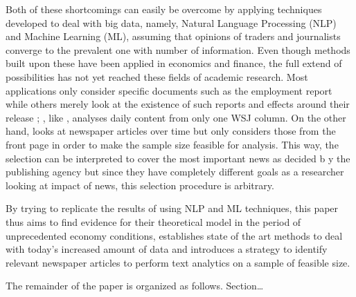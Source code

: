 Both of these shortcomings can easily be overcome by applying techniques developed to deal with big data, namely, Natural Language Processing (NLP) and Machine Learning (ML), assuming that opinions of traders and journalists converge to the prevalent one with number of information. Even though methods built upon these have been applied in economics and finance, the full extend of possibilities has not yet reached these fields of academic research. Most applications only consider specific documents such as the employment report \parencite{Hautsch.2002,Hess.2004} while others merely look at the existence of such reports and effects around their release \parencite{Bomfim.2003,Hautsch.2011,Lucca.2015}; \textcite{Tetlock.2007}, like \textcite{Ellingsen.2001}, analyses daily content from only one WSJ column. On the other hand, \textcite{Manela.2017} looks at newspaper articles over time but only considers those from the front page in order to make the sample size feasible for analysis. This way, the selection can be interpreted to cover the most important news as decided b y the publishing agency but since they have completely different goals as a researcher looking at impact of news, this selection procedure is arbitrary.

By trying to replicate the results of \textcite{Ellingsen.2001} using NLP and ML techniques, this paper thus aims to find evidence for their theoretical model in the period of unprecedented economy conditions, establishes state of the art methods to deal with today's increased amount of data and introduces a strategy to identify relevant newspaper articles to perform text analytics on a sample of feasible size. 

The remainder of the paper is organized as follows. Section\dots

